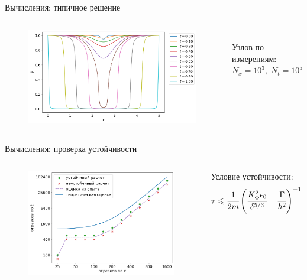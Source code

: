 \begin{frame}{Вычисления: типичное решение}
\vspace{-0.4cm}
\begin{columns}
\begin{figure}
	\includegraphics[width=\textwidth]{figures/typical_solution.png}
\end{figure}
\hfill \\
\vspace{3.5cm}
\hspace{-2.5cm}
Узлов по измерениям: \\
\hspace{-2.5cm}
$N_x = 10^3, \; N_t = 10^5$
\end{columns}
\end{frame}


\begin{frame}{Вычисления: проверка устойчивости}
\vspace{-0.4cm}
\begin{columns}
\begin{figure}
	\includegraphics[width=\textwidth]{figures/stability_bounds.png}
\end{figure}
Условие устойчивости:
$$\tau \leqslant \cfrac{1}{2m} \left( \cfrac{K_\Phi^2 \epsilon_0}{\delta^{5/3}} +
\cfrac{\Gamma}{h^2} \right)^{-1}$$
\end{columns}
\end{frame}


